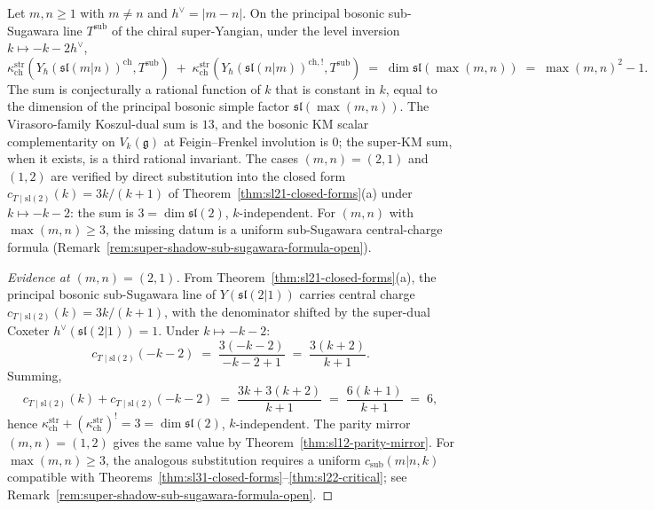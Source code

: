 \begin{conjecture}
\label{thm:super-shadow-self-duality}
\ClaimStatusConjectured
Let $m, n \ge 1$ with $m \ne n$ and $h^\vee = |m - n|$. On the
principal bosonic sub-Sugawara line $T^{\mathrm{sub}}$ of the chiral
super-Yangian, under the level inversion $k \mapsto -k - 2 h^\vee$,
\begin{equation}
\label{eq:super-shadow-complementarity}
\kappa_{\mathrm{ch}}^{\mathrm{str}}(Y_\hbar(\mathfrak{sl}(m|n))^{\mathrm{ch}}, T^{\mathrm{sub}}) \;+\;
\kappa_{\mathrm{ch}}^{\mathrm{str}}(Y_\hbar(\mathfrak{sl}(n|m))^{\mathrm{ch}, !}, T^{\mathrm{sub}})
\;=\; \dim \mathfrak{sl}(\max(m, n)) \;=\; \max(m, n)^2 - 1.
\end{equation}
The sum is conjecturally a rational function of $k$ that is constant
in $k$, equal to the dimension of the principal bosonic simple factor
$\mathfrak{sl}(\max(m, n))$. The Virasoro-family Koszul-dual sum is
$13$, and the bosonic KM scalar complementarity on
$V_k(\mathfrak{g})$ at Feigin--Frenkel involution is $0$; the
super-KM sum, when it exists, is a third rational invariant. The cases
$(m, n) = (2, 1)$ and $(1, 2)$ are verified by direct substitution into
the closed form
$c_{T \mid \mathrm{sl}(2)}(k) = 3k/(k+1)$ of
Theorem~\ref{thm:sl21-closed-forms}(a) under $k \mapsto -k - 2$: the
sum is $3 = \dim \mathfrak{sl}(2)$, $k$-independent. For
$(m, n)$ with $\max(m, n) \ge 3$, the missing datum is a uniform
sub-Sugawara central-charge formula
(Remark~\ref{rem:super-shadow-sub-sugawara-formula-open}).
\end{conjecture}

\begin{proof}[Evidence at $(m, n) = (2, 1)$]
From Theorem~\ref{thm:sl21-closed-forms}(a), the principal bosonic
sub-Sugawara line of $Y(\mathfrak{sl}(2|1))$ carries central charge
$c_{T \mid \mathrm{sl}(2)}(k) = 3k/(k + 1)$, with the denominator
shifted by the super-dual Coxeter $h^\vee(\mathfrak{sl}(2|1)) = 1$.
Under $k \mapsto -k - 2$:
\[
c_{T \mid \mathrm{sl}(2)}(-k - 2) \;=\; \frac{3(-k - 2)}{-k - 2 + 1}
\;=\; \frac{3(k + 2)}{k + 1}.
\]
Summing,
\[
c_{T \mid \mathrm{sl}(2)}(k) + c_{T \mid \mathrm{sl}(2)}(-k - 2)
\;=\; \frac{3k + 3(k + 2)}{k + 1}
\;=\; \frac{6(k + 1)}{k + 1}
\;=\; 6,
\]
hence $\kappa_{\mathrm{ch}}^{\mathrm{str}} +
(\kappa_{\mathrm{ch}}^{\mathrm{str}})^! = 3 =
\dim \mathfrak{sl}(2)$, $k$-independent. The parity mirror
$(m, n) = (1, 2)$ gives the same value by
Theorem~\ref{thm:sl12-parity-mirror}. For $\max(m, n) \ge 3$, the
analogous substitution requires a uniform
$c_{\mathrm{sub}}(m|n, k)$ compatible with
Theorems~\ref{thm:sl31-closed-forms}--\ref{thm:sl22-critical};
see Remark~\ref{rem:super-shadow-sub-sugawara-formula-open}.
\end{proof}

